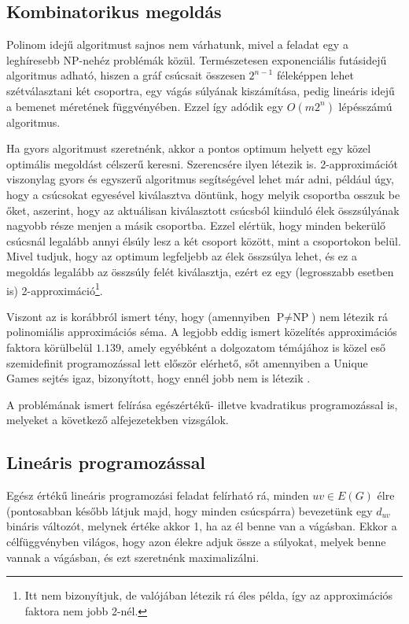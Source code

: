 \subsection{Kombinatorikus megoldás}\label{sec:theoryMaxCutComb}

Polinom idejű algoritmust sajnos nem várhatunk, mivel a feladat egy a leghíresebb NP-nehéz problémák közül. Természetesen exponenciális futásidejű algoritmus adható, hiszen a gráf csúcsait összesen $2^{n-1}$ féleképpen lehet szétválasztani két csoportra, egy vágás súlyának kiszámítása, pedig lineáris idejű a bemenet méretének függvényében. Ezzel így adódik egy $O(m 2^n)$ lépésszámú algoritmus.

Ha gyors algoritmust szeretnénk, akkor a pontos optimum helyett egy közel optimális megoldást célszerű keresni. Szerencsére ilyen létezik is. 2-approximációt viszonylag gyors és egyszerű algoritmus segítségével lehet már adni, például úgy, hogy a csúcsokat egyesével kiválasztva döntünk, hogy melyik csoportba osszuk be őket, aszerint, hogy az aktuálisan kiválasztott csúcsból kiinduló élek összsúlyának nagyobb része menjen a másik csoportba. Ezzel elértük, hogy minden bekerülő csúcsnál legalább annyi élsúly lesz a két csoport között, mint a csoportokon belül. Mivel tudjuk, hogy az optimum legfeljebb az élek összsúlya lehet, és ez a megoldás legalább az összsúly felét kiválasztja, ezért ez egy (legrosszabb esetben is) 2-approximáció\footnote{Itt nem bizonyítjuk, de valójában létezik rá éles példa, így az approximációs faktora nem jobb 2-nél.}.

Viszont az is korábbról ismert tény, hogy (amennyiben $\text{P} \neq \text{NP}$) nem létezik rá polinomiális approximációs séma. A legjobb eddig ismert közelítés approximációs faktora körülbelül $1.139$, amely egyébként a dolgozatom témájához is közel eső szemidefinit programozással lett először elérhető, sőt amennyiben a Unique Games sejtés igaz, bizonyított, hogy ennél jobb nem is létezik \cite{10.1145/227683.227684, wiki:Maximum_cut}.

A problémának ismert felírása egészértékű- illetve kvadratikus programozással is, melyeket a következő alfejezetekben vizsgálok.

\subsection{Lineáris programozással}\label{sec:theoryMaxCutLP}

Egész értékű lineáris programozási feladat felírható rá, minden $uv \in E(G)$ élre (pontosabban később látjuk majd, hogy minden csúcspárra) bevezetünk egy $d_{uv}$ bináris változót, melynek értéke akkor 1, ha az él benne van a vágásban. Ekkor a célfüggvényben világos, hogy azon élekre adjuk össze a súlyokat, melyek benne vannak a vágásban, és ezt szeretnénk maximalizálni.

